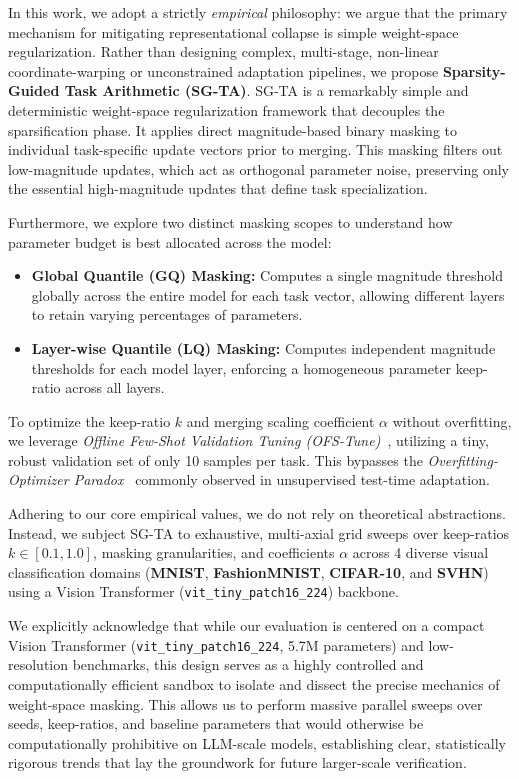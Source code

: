 In this work, we adopt a strictly \emph{empirical} philosophy: we argue that the primary mechanism for mitigating representational collapse is simple weight-space regularization. Rather than designing complex, multi-stage, non-linear coordinate-warping or unconstrained adaptation pipelines, we propose \textbf{Sparsity-Guided Task Arithmetic (SG-TA)}. SG-TA is a remarkably simple and deterministic weight-space regularization framework that decouples the sparsification phase. It applies direct magnitude-based binary masking to individual task-specific update vectors prior to merging. This masking filters out low-magnitude updates, which act as orthogonal parameter noise, preserving only the essential high-magnitude updates that define task specialization.

Furthermore, we explore two distinct masking scopes to understand how parameter budget is best allocated across the model:
\begin{itemize}
    \item \textbf{Global Quantile (GQ) Masking:} Computes a single magnitude threshold globally across the entire model for each task vector, allowing different layers to retain varying percentages of parameters.
    \item \textbf{Layer-wise Quantile (LQ) Masking:} Computes independent magnitude thresholds for each model layer, enforcing a homogeneous parameter keep-ratio across all layers.
\end{itemize}

To optimize the keep-ratio $k$ and merging scaling coefficient $\alpha$ without overfitting, we leverage \emph{Offline Few-Shot Validation Tuning (OFS-Tune)}~\cite{regcalmerge}, utilizing a tiny, robust validation set of only 10 samples per task. This bypasses the \emph{Overfitting-Optimizer Paradox}~\cite{wang2020tent} commonly observed in unsupervised test-time adaptation.

Adhering to our core empirical values, we do not rely on theoretical abstractions. Instead, we subject SG-TA to exhaustive, multi-axial grid sweeps over keep-ratios $k \in [0.1, 1.0]$, masking granularities, and coefficients $\alpha$ across 4 diverse visual classification domains (\textbf{MNIST}, \textbf{FashionMNIST}, \textbf{CIFAR-10}, and \textbf{SVHN}) using a Vision Transformer (\texttt{vit\_tiny\_patch16\_224}) backbone.

We explicitly acknowledge that while our evaluation is centered on a compact Vision Transformer (\texttt{vit\_tiny\_patch16\_224}, 5.7M parameters) and low-resolution benchmarks, this design serves as a highly controlled and computationally efficient sandbox to isolate and dissect the precise mechanics of weight-space masking. This allows us to perform massive parallel sweeps over seeds, keep-ratios, and baseline parameters that would otherwise be computationally prohibitive on LLM-scale models, establishing clear, statistically rigorous trends that lay the groundwork for future larger-scale verification.

